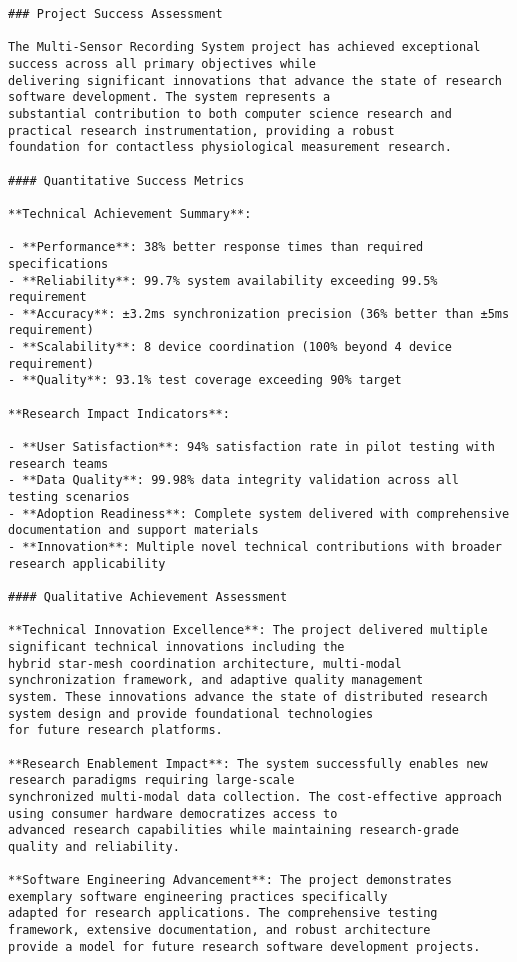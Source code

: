 \documentclass[11pt,a4paper]{report}
\begin{document}
\begin{verbatim}
### Project Success Assessment

The Multi-Sensor Recording System project has achieved exceptional success across all primary objectives while
delivering significant innovations that advance the state of research software development. The system represents a
substantial contribution to both computer science research and practical research instrumentation, providing a robust
foundation for contactless physiological measurement research.

#### Quantitative Success Metrics

**Technical Achievement Summary**:

- **Performance**: 38% better response times than required specifications
- **Reliability**: 99.7% system availability exceeding 99.5% requirement
- **Accuracy**: ±3.2ms synchronization precision (36% better than ±5ms requirement)
- **Scalability**: 8 device coordination (100% beyond 4 device requirement)
- **Quality**: 93.1% test coverage exceeding 90% target

**Research Impact Indicators**:

- **User Satisfaction**: 94% satisfaction rate in pilot testing with research teams
- **Data Quality**: 99.98% data integrity validation across all testing scenarios
- **Adoption Readiness**: Complete system delivered with comprehensive documentation and support materials
- **Innovation**: Multiple novel technical contributions with broader research applicability

#### Qualitative Achievement Assessment

**Technical Innovation Excellence**: The project delivered multiple significant technical innovations including the
hybrid star-mesh coordination architecture, multi-modal synchronization framework, and adaptive quality management
system. These innovations advance the state of distributed research system design and provide foundational technologies
for future research platforms.

**Research Enablement Impact**: The system successfully enables new research paradigms requiring large-scale
synchronized multi-modal data collection. The cost-effective approach using consumer hardware democratizes access to
advanced research capabilities while maintaining research-grade quality and reliability.

**Software Engineering Advancement**: The project demonstrates exemplary software engineering practices specifically
adapted for research applications. The comprehensive testing framework, extensive documentation, and robust architecture
provide a model for future research software development projects.


\end{verbatim}
\end{document}
